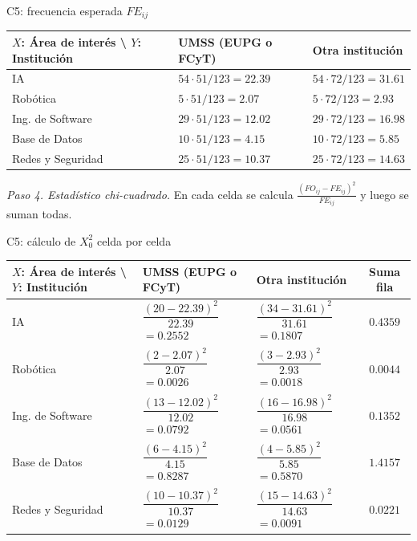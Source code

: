 \begin{mitabla}{C5: frecuencia esperada $FE_{ij}$}
\begin{tabular}{L{3.8cm}C{3.00cm}C{3.00cm}}
\toprule
$X$: Área de interés \textbackslash{} $Y$: Institución & UMSS (EUPG o FCyT) & Otra institución \\
\midrule
IA & $54\cdot51/123 = 22.39$ & $54\cdot72/123 = 31.61$ \\
Robótica & $5\cdot51/123 = 2.07$ & $5\cdot72/123 = 2.93$ \\
Ing. de Software & $29\cdot51/123 = 12.02$ & $29\cdot72/123 = 16.98$ \\
Base de Datos & $10\cdot51/123 = 4.15$ & $10\cdot72/123 = 5.85$ \\
Redes y Seguridad & $25\cdot51/123 = 10.37$ & $25\cdot72/123 = 14.63$ \\
\bottomrule
\end{tabular}
\end{mitabla}

\textit{Paso 4. Estadístico chi-cuadrado.} En cada celda se calcula $\frac{(FO_{ij}-FE_{ij})^2}{FE_{ij}}$ y luego se suman todas.

\begin{mitabla}{C5: cálculo de $X_0^2$ celda por celda}
\begin{tabular}{L{3.2cm}C{3.20cm}C{3.20cm}|c}
\toprule
$X$: Área de interés \textbackslash{} $Y$: Institución & UMSS (EUPG o FCyT) & Otra institución & Suma fila \\
\midrule
IA & $\dfrac{(20-22.39)^2}{22.39}$\newline $= 0.2552$ & $\dfrac{(34-31.61)^2}{31.61}$\newline $= 0.1807$ & $0.4359$ \\[6pt]
Robótica & $\dfrac{(2-2.07)^2}{2.07}$\newline $= 0.0026$ & $\dfrac{(3-2.93)^2}{2.93}$\newline $= 0.0018$ & $0.0044$ \\[6pt]
Ing. de Software & $\dfrac{(13-12.02)^2}{12.02}$\newline $= 0.0792$ & $\dfrac{(16-16.98)^2}{16.98}$\newline $= 0.0561$ & $0.1352$ \\[6pt]
Base de Datos & $\dfrac{(6-4.15)^2}{4.15}$\newline $= 0.8287$ & $\dfrac{(4-5.85)^2}{5.85}$\newline $= 0.5870$ & $1.4157$ \\[6pt]
Redes y Seguridad & $\dfrac{(10-10.37)^2}{10.37}$\newline $= 0.0129$ & $\dfrac{(15-14.63)^2}{14.63}$\newline $= 0.0091$ & $0.0221$ \\[6pt]
\bottomrule
\end{tabular}
\end{mitabla}


